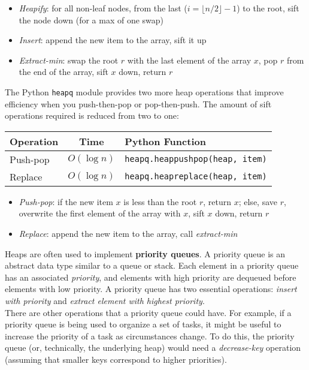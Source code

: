\documentclass[12pt, titlepage]{article}
\newcommand{\floor}[1]{\lfloor #1 \rfloor}
\begin{document}
\begin{itemize}
  \item \textit{Heapify}: for all non-leaf nodes, from the last ($i = \floor{n/2} - 1$) to the root, sift the node down (for a max of one swap)
  \item \textit{Insert}: append the new item to the array, sift it up
  \item \textit{Extract-min}: swap the root $r$ with the last element of the array $x$, pop $r$ from the end of the array, sift $x$ down, return $r$
\end{itemize}

The Python \texttt{heapq} module provides two more heap operations that improve efficiency when you push-then-pop or pop-then-push. The amount of sift operations required is reduced from two to one:
\begin{center}
\begin{tabular}{|l|c|l|}
  \hline
  \textbf{Operation} & \textbf{Time} & \textbf{Python Function} \\
  \hline
  Push-pop & $O(\log n)$ & \texttt{heapq.heappushpop(heap, item)} \\
  Replace & $O(\log n)$ & \texttt{heapq.heapreplace(heap, item)} \\
  \hline
\end{tabular}
\end{center}

\begin{itemize}
  \item \textit{Push-pop}: if the new item $x$ is less than the root $r$, return $x$; else, save $r$, overwrite the first element of the array with $x$, sift $x$ down, return $r$
  \item \textit{Replace}: append the new item to the array, call \textit{extract-min}
\end{itemize}

Heaps are often used to implement \textbf{priority queues}. A priority queue is an abstract data type similar to a queue or stack. Each element in a priority queue has an associated \textit{priority}, and elements with high priority are dequeued before elements with low priority. A priority queue has two essential operations: \textit{insert with priority} and \textit{extract element with highest priority}. \\

There are other operations that a priority queue could have. For example, if a priority queue is being used to organize a set of tasks, it might be useful to increase the priority of a task as circumstances change. To do this, the priority queue (or, technically, the underlying heap) would need a \textit{decrease-key} operation (assuming that smaller keys correspond to higher priorities). \\
\end{document}
